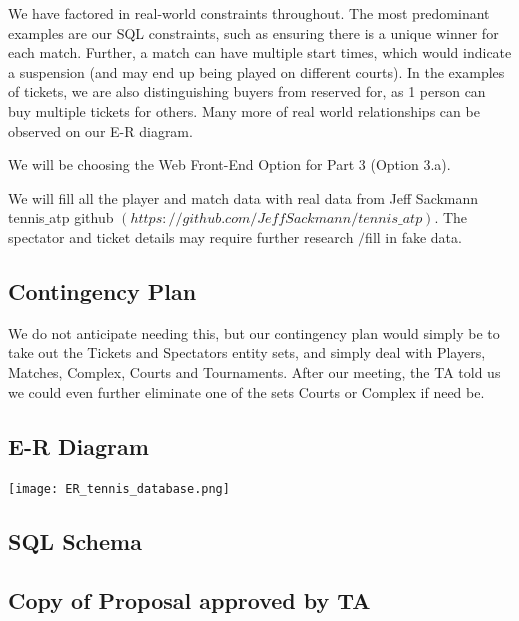 \documentclass[11pt]{article}
\begin{document}
\begin{enumerate}
We have factored in real-world constraints throughout. The most predominant examples are our SQL constraints, such as ensuring there is a unique winner for each match. Further, a match can have multiple start times, which would indicate a suspension (and may end up being played on different courts). In the examples of tickets, we are also distinguishing buyers from reserved for, as 1 person can buy multiple tickets for others. Many more of real world relationships can be observed on our E-R diagram.

We will be choosing the Web Front-End Option for Part 3 (Option 3.a).

We will fill all the player and match data with real data from Jeff Sackmann tennis$\_$atp github $(https://github.com/JeffSackmann/tennis\_atp)$. The spectator and ticket details may require further research $/$fill in fake data.
\end{enumerate}


\subsection*{Contingency Plan}
We do not anticipate needing this, but our contingency plan would simply be to take out the Tickets and Spectators entity sets, and simply deal with Players, Matches, Complex, Courts and Tournaments. After our meeting, the TA told us we could even further eliminate one of the sets Courts or Complex if need be.

\newpage
\subsection*{E-R Diagram}
\texttt{[image: ER\_tennis\_database.png]}

\newpage
\subsection*{SQL Schema}


\newpage
\subsection*{Copy of Proposal approved by TA}
\begin{mdframed}
\end{mdframed}
\end{document}
